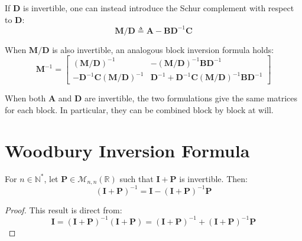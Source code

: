\begin{remark}\label{th:Schur_D}
	If $\mathbf{D}$ is invertible, one can instead introduce the Schur complement with respect to $\mathbf{D}$:
	\begin{equation}
		\mathbf{M}/\mathbf{D}\triangleq \mathbf{A}-\mathbf{B}\mathbf{D}^{-1}\mathbf{C}
	\end{equation}

	When $\mathbf{M}/\mathbf{D}$ is also invertible, an analogous block inversion formula holds:
	\begin{equation}
		\mathbf{M}^{-1}=\begin{bmatrix}(\mathbf{M}/\mathbf{D})^{-1}&-(\mathbf{M}/\mathbf{D})^{-1}\mathbf{B}\mathbf{D}^{-1}\\-\mathbf{D}^{-1}\mathbf{C}(\mathbf{M}/\mathbf{D})^{-1}&\mathbf{D}^{-1}+\mathbf{D}^{-1}\mathbf{C}(\mathbf{M}/\mathbf{D})^{-1}\mathbf{B}\mathbf{D}^{-1}\end{bmatrix}
	\end{equation}
\end{remark}

\begin{remark}
	When both $\mathbf{A}$ and $\mathbf{D}$ are invertible, the two formulations give the same matrices for each block. In particular, they can be combined block by block at will.
\end{remark}

\section{Woodbury Inversion Formula}

\begin{proposition}\label{th:simplified_Woodbury}
	For $n\in\mathbb{N}^*$, let $\mathbf{P}\in\mathcal{M}_{n,n}(\mathbb{R})$ such that $\mathbf{I}+\mathbf{P}$ is invertible. Then:
	\begin{equation}
		(\mathbf{I}+\mathbf{P})^{-1}=\mathbf{I}-(\mathbf{I}+\mathbf{P})^{-1}\mathbf{P}
	\end{equation}
\end{proposition}

\begin{proof}
	This result is direct from:
	\begin{equation}
		\mathbf{I}=(\mathbf{I}+\mathbf{P})^{-1}(\mathbf{I}+\mathbf{P})=(\mathbf{I}+\mathbf{P})^{-1}+(\mathbf{I}+\mathbf{P})^{-1}\mathbf{P}
	\end{equation}
\end{proof}

